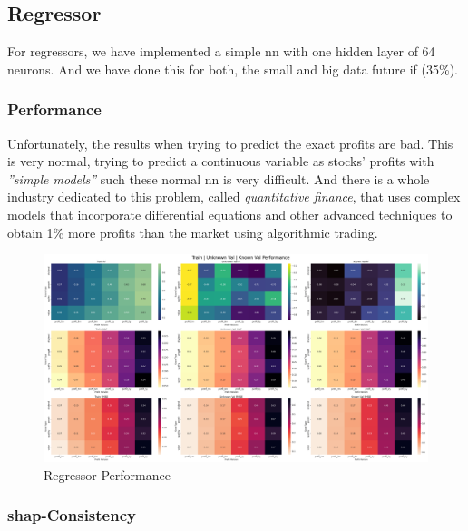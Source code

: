 \documentclass[11pt,english,a4paper,hidelinks]{book}
\begin{document}
\subsection{Regressor}

\noindent For regressors, we have implemented a simple \acrshort{nn} with one hidden layer of 64 neurons. And we have done this for both, the small and big data future \acrshort{if} (35\%).

\subsubsection{Performance}


\noindent Unfortunately, the results when trying to predict the exact profits are bad. This is very normal, trying to predict a continuous variable as stocks' profits with \textit{''simple models''} such these normal \acrshort{nn} is very difficult. And there is a whole industry dedicated to this problem, called \textit{quantitative finance}, that uses complex models that incorporate differential equations and other advanced techniques to obtain 1\% more profits than the market using algorithmic trading.

\begin{figure}[H]
    \centering
    \includegraphics[width=1\textwidth]{images/code/models/neural_network/regressor_nn/Big Data future - IF HARD Balanced/performance summary.png}
    \caption{Regressor Performance}
    \label{fig:regressor}
\end{figure}

\subsubsection{\acrshort{shap}-Consistency}


\end{document}
